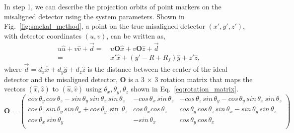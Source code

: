 In step 1, we can describe the projection orbits of point markers on the misaligned detector using the system parameters.  Shown in Fig.~\ref{fig:smekal_method}, a point on the true misaligned detector $(x', y', z')$, with detector coordinates $(u, v)$, can be written as,
%
\begin{equation}
\begin{aligned}
u \hat{u} + v \hat{v} + \vec{d} =& \, u \mathrm{\mathbf{O}} \hat{x} + v \mathrm{\mathbf{O}} \hat{z} + \vec{d} \\
								=& \, x' \hat{x} + (y' - R + R_f) \hat{y} + z' \hat{z},
\end{aligned}
\label{eq:projection_orbit}
\end{equation}
%
where $\vec{d} = d_x \hat{x} + d_y \hat{y} + d_z \hat{z}$ is the distance between the center of the ideal detector and the misaligned detector, $\mathrm{\mathbf{O}}$ is a 3 $\times$ 3 rotation matrix that maps the vectors $(\hat{x}, \hat{z})$ to $(\hat{u}, \hat{v})$ using $\theta_x, \theta_y, \theta_z$ shown in Eq.~\ref{eq:rotation_matrix}.
%
\begin{equation}
\mathrm{\mathbf{O}} = 
\begin{pmatrix}
cos\, \theta_y \, cos \,\theta_z - sin \, \theta_y \, sin \, \theta_x \, sin \, \theta_z & -cos \, \theta_x \, sin \, \theta_z & -cos \, \theta_z \, sin \, \theta_y - cos \, \theta_y \, sin \, \theta_x \, sin \, \theta_z \\
cos \, \theta_z \, sin \, \theta_y \, sin \, \theta_x + cos \, \theta_y \, \sin \, \theta_z & cos \, \theta_x cos \, \theta_z & cos \, \theta_y \, cos \, \theta_z \, sin \, \theta_x - sin \, \theta_y \, sin \, \theta_z \\
cos \, \theta_x \, sin \, \theta_y & -sin \, \theta_x & cos \, \theta_y \, cos \, \theta_x \\
\end{pmatrix}
\label{eq:rotation_matrix}
\end{equation}

